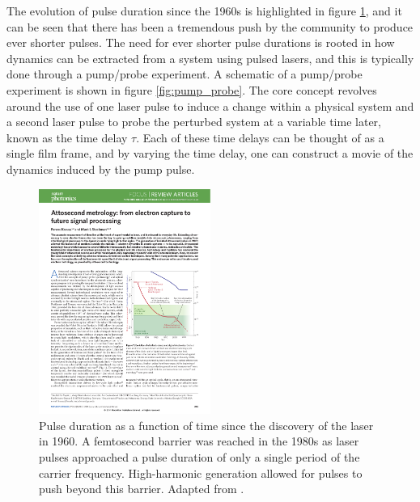 The evolution of pulse duration since the 1960s is highlighted in figure \ref{fig:Pulse_duration}, and it can be seen that there has been a tremendous push by the community to produce ever shorter pulses.  The need for ever shorter pulse durations is rooted in how dynamics can be extracted from a system using pulsed lasers, and this is typically done through a pump/probe experiment. A schematic of a pump/probe experiment is shown in figure \ref{fig:pump_probe}.  The core concept revolves around the use of one laser pulse to induce a change within a physical system and a second laser pulse to probe the perturbed system at a variable time later, known as the time delay $\tau$.  Each of these time delays can be thought of as a single film frame, and by varying the time delay, one can construct a movie of the dynamics induced by the pump pulse.  

\begin{figure}
	\centering
	\includegraphics[width=0.5\textwidth]{figures/Introduction/Pulse_duration.pdf}
	\caption[Pulse duration as a function of time since the 1960s]{Pulse duration as a function of time since the discovery of the laser in 1960.  A femtosecond barrier was reached in the 1980s as laser pulses approached a pulse duration of only a single period of the carrier frequency.  High-harmonic generation allowed for pulses to push beyond this barrier.  Adapted from \cite{krauszAttosecondMetrologyElectron2014}.}
	\label{fig:Pulse_duration}
\end{figure}

